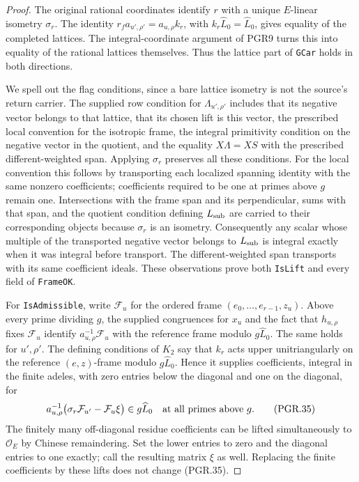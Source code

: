 \documentclass[11pt,a4paper]{article}
\numberwithin{equation}{section}
\theoremstyle{remark}\newtheorem{remark}[theorem]{Remark}
\begin{document}
\begin{proof}
The original rational coordinates identify \(r\) with a unique
\(E\)-linear isometry \(\sigma_r\).  The identity
\(r_f a_{u',\rho'}=a_{u,\rho}k_r\), with
\(k_r\widehat L_0=\widehat L_0\), gives equality of the
completed lattices.  The integral-coordinate argument of PGR9 turns
this into equality of the rational lattices themselves.  Thus the
lattice part of \texttt{GCar} holds in both directions.

We spell out the flag conditions, since a bare lattice isometry is
not the source's return carrier.  The supplied row condition for
\(\Lambda_{u',\rho'}\) includes that its negative vector belongs
to that lattice, that its chosen lift is this vector, the prescribed
local convention for the isotropic frame, the integral primitivity
condition on the negative vector in the quotient, and the equality
\(X\Lambda=XS\) with the prescribed different-weighted span.
Applying \(\sigma_r\) preserves all these conditions.  For the
local convention this follows by transporting each localized spanning
identity with the same nonzero coefficients; coefficients required
to be one at primes above \(g\) remain one.  Intersections with
the frame span and its perpendicular, sums with that span, and the
quotient condition defining \(L_{\rm sub}\) are carried to their
corresponding objects because \(\sigma_r\) is an isometry.
Consequently any scalar whose multiple of the transported negative
vector belongs to \(L_{\rm sub}\) is integral exactly when it was
integral before transport.  The different-weighted span transports
with its same coefficient ideals.  These observations prove both
\texttt{Is\allowbreak Lift} and every field of \texttt{Frame\allowbreak OK}.

For \texttt{Is\allowbreak Admissible}, write \(\mathcal F_u\) for the
ordered frame \((e_0,\ldots,e_{r-1},z_u)\).  Above every prime
dividing \(g\), the supplied congruences for \(x_u\) and the
fact that \(h_{u,\rho}\) fixes \(\mathcal F_u\) identify
\(a_{u,\rho}^{-1}\mathcal F_u\) with the reference frame
modulo \(g\widehat L_0\).  The same holds for \(u',\rho'\).
The defining conditions of \(K_2\) say that \(k_r\) acts
upper unitriangularly on the reference \((e,z)\)-frame modulo
\(g\widehat L_0\).  Hence it supplies coefficients, integral
in the finite adeles, with zero entries below the diagonal and one
on the diagonal, for
\[
 a_{u,\rho}^{-1}
       \bigl(\sigma_r\mathcal F_{u'}-\mathcal F_u\xi\bigr)
                 \in g\widehat L_0
                        \quad\hbox{at all primes above }g.
\tag{PGR.35}
\]
The finitely many off-diagonal residue coefficients can be lifted
simultaneously to \(\mathcal O_E\) by Chinese remaindering.
Set the lower entries to zero and the diagonal entries to one
exactly; call the resulting matrix \(\xi\) as well.  Replacing
the finite coefficients by these lifts does not change (PGR.35).


\end{proof}
\end{document}
